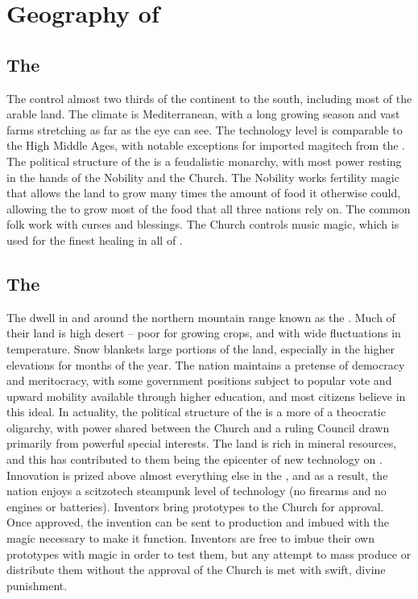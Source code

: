 \documentclass[blue]{GL2020}
\begin{document}
\section*{Geography of \pEarth{}}

\subsection*{The \pFarm{}}
The \pFarm{} control almost two thirds of the continent to the south, including most of the arable land. The climate is Mediterranean, with a long growing season and vast farms stretching as far as the eye can see. The technology level is comparable to the High Middle Ages, with notable exceptions for imported magitech from the \pTech{}. The political structure of the \pFarm{} is a feudalistic monarchy, with most power resting in the hands of the Nobility and the Church. The Nobility works fertility magic that allows the land to grow many times the amount of food it otherwise could, allowing the \pFarmers{} to grow most of the food that all three nations rely on. The common folk work with curses and blessings. The Church controls music magic, which is used for the finest healing in all of \pEarth{}. 

\subsection*{The \pTech{}}
The \pTech{} dwell in and around the northern mountain range known as the \pSpine{}. Much of their land is high desert -- poor for growing crops, and with wide fluctuations in temperature. Snow blankets large portions of the land, especially in the higher elevations for months of the year. The nation maintains a pretense of democracy and meritocracy, with some government positions subject to popular vote and upward mobility available through higher education, and most citizens believe in this ideal. In actuality, the political structure of the \pTech{} is a more of a theocratic oligarchy, with power shared between the Church and a ruling Council drawn primarily from powerful special interests. The \pTech{} land is rich in mineral resources, and this has contributed to them being the epicenter of new technology on \pEarth{}. Innovation is prized above almost everything else in the \pTech{}, and as a result, the nation enjoys a scitzotech steampunk level of technology (no firearms and no engines or batteries). Inventors bring prototypes to the Church for approval. Once approved, the invention can be sent to production and imbued with the magic necessary to make it function. Inventors are free to imbue their own prototypes with magic in order to test them, but any attempt to mass produce or distribute them without the approval of the Church is met with swift, divine punishment.
\end{document}
